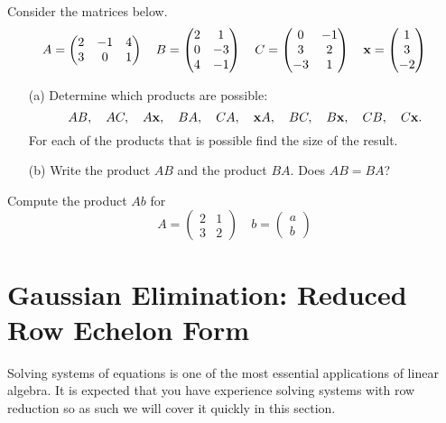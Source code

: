 \begin{problem}
    Consider the matrices below.
    \[ A = \begin{pmatrix} 2 & -1 & 4 \\ 3 & 0 & 1 \end{pmatrix} \quad B = \begin{pmatrix}
            2 & 1 \\ 0 & -3 \\ 4 & -1 \end{pmatrix} \quad C = \begin{pmatrix} 0 & -1 \\ 3
            & 2 \\ -3 & 1 \end{pmatrix} \quad {\bf x} = \begin{pmatrix} 1 \\ 3 \\ -2
    \end{pmatrix} \]
    \begin{enumerate}
        \item[(a)] Determine which products are possible:
            \[ AB, \quad AC, \quad A{\bf x}, \quad BA, \quad CA, \quad {\bf x} A, \quad BC,
            \quad B {\bf x}, \quad CB, \quad C{\bf x}. \]
            For each of the products that is possible find the size of the result.
        \item[(b)] Write the product $AB$ and the product $BA$.  Does $AB = BA$?
    \end{enumerate}
\end{problem}


\begin{problem}
    Compute the product $Ab$ for 
    \[ A = \begin{pmatrix} 2 & 1 \\ 3 & 2 \end{pmatrix} \quad b = \begin{pmatrix} a \\ b
        \end{pmatrix} \]
\end{problem}
\solution{
}


\newpage\section{Gaussian Elimination: Reduced Row Echelon Form}
Solving systems of equations is one of the most essential applications of linear algebra.
It is expected that you have experience solving systems with row reduction so as such we
will cover it quickly in this section.

